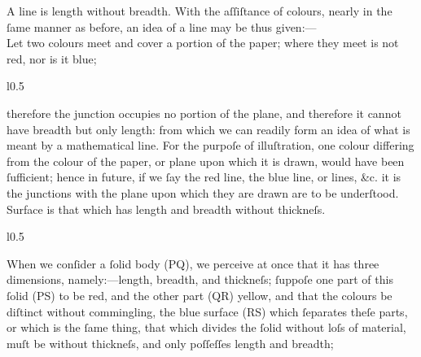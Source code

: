 \begin{minipage}{0.80\textwidth}
    A line is length without breadth. With the aſſiſtance of colours, nearly in the ſame manner as before, an idea of a line may be thus given:—\\

    Let two colours meet and cover a portion of the paper; where they meet is not red, nor is it blue;
    \begin{wrapfigure}{l}{0.5\textwidth}
        \centering
        
    \end{wrapfigure}
    therefore the junction occupies no portion of the plane, and therefore it cannot have breadth but only length: from which we can readily form an idea of what is meant by a mathematical line.  For the purpoſe of illuſtration, one colour differing from the colour of the paper, or plane upon which it is drawn, would have been ſufficient; hence in future, if we ſay the red line, the blue line, or lines, \&c. it is the junctions with the plane upon which they are drawn are to be underſtood.\\

    Surface is that which has length and breadth without thickneſs.
    \begin{wrapfigure}{l}{0.5\textwidth}
        \centering
        
    \end{wrapfigure}
    When we conſider a ſolid body (PQ), we perceive at once that it has three dimensions, namely:—length, breadth, and thickneſs;  ſuppoſe one part of this ſolid (PS) to be red, and the other part (QR) yellow, and that the colours be diſtinct without commingling, the blue surface (RS) which ſeparates theſe parts, or which is the ſame thing, that which divides the ſolid without loſs of material, muſt be without thickneſs, and only poſſeſſes length and breadth;
\end{minipage}%

\newpage

